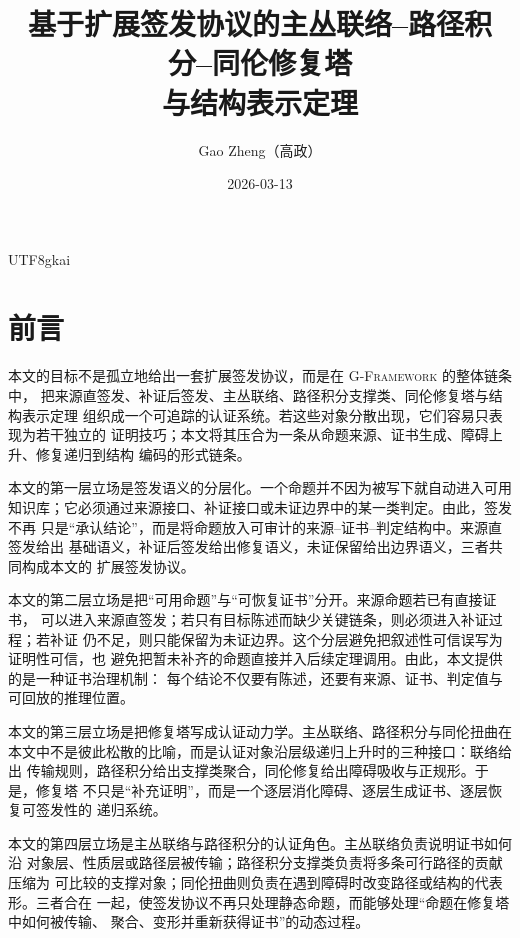 \documentclass[12pt]{article}
\newcommand{\GFramework}{\textsc{G-Framework}}
\begin{document}
\begin{CJK*}{UTF8}{gkai}

\title{基于扩展签发协议的主丛联络--路径积分--同伦修复塔\\与结构表示定理}
\newcommand{\CertificateAuthorCN}{Gao Zheng（高政）}
\author{\CertificateAuthorCN}
\date{2026-03-13}
\maketitle

\section*{前言}

本文的目标不是孤立地给出一套扩展签发协议，而是在 \GFramework{} 的整体链条中，
把来源直签发、补证后签发、主丛联络、路径积分支撑类、同伦修复塔与结构表示定理
组织成一个可追踪的认证系统。若这些对象分散出现，它们容易只表现为若干独立的
证明技巧；本文将其压合为一条从命题来源、证书生成、障碍上升、修复递归到结构
编码的形式链条。

本文的第一层立场是签发语义的分层化。一个命题并不因为被写下就自动进入可用
知识库；它必须通过来源接口、补证接口或未证边界中的某一类判定。由此，签发不再
只是“承认结论”，而是将命题放入可审计的来源--证书--判定结构中。来源直签发给出
基础语义，补证后签发给出修复语义，未证保留给出边界语义，三者共同构成本文的
扩展签发协议。

本文的第二层立场是把“可用命题”与“可恢复证书”分开。来源命题若已有直接证书，
可以进入来源直签发；若只有目标陈述而缺少关键链条，则必须进入补证过程；若补证
仍不足，则只能保留为未证边界。这个分层避免把叙述性可信误写为证明性可信，也
避免把暂未补齐的命题直接并入后续定理调用。由此，本文提供的是一种证书治理机制：
每个结论不仅要有陈述，还要有来源、证书、判定值与可回放的推理位置。

本文的第三层立场是把修复塔写成认证动力学。主丛联络、路径积分与同伦扭曲在
本文中不是彼此松散的比喻，而是认证对象沿层级递归上升时的三种接口：联络给出
传输规则，路径积分给出支撑类聚合，同伦修复给出障碍吸收与正规形。于是，修复塔
不只是“补充证明”，而是一个逐层消化障碍、逐层生成证书、逐层恢复可签发性的
递归系统。

本文的第四层立场是主丛联络与路径积分的认证角色。主丛联络负责说明证书如何沿
对象层、性质层或路径层被传输；路径积分支撑类负责将多条可行路径的贡献压缩为
可比较的支撑对象；同伦扭曲则负责在遇到障碍时改变路径或结构的代表形。三者合在
一起，使签发协议不再只处理静态命题，而能够处理“命题在修复塔中如何被传输、
聚合、变形并重新获得证书”的动态过程。


\end{CJK*}
\end{document}
